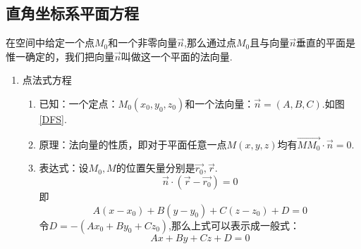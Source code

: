 \subsection{直角坐标系平面方程}
\tdefination[法向量]
在空间中给定一个点$M_0$和一个非零向量$\overrightarrow{n}$,那么通过点$M_0$且与向量$\overrightarrow{n}$垂直的平面是惟一确定的，我们把向量$\overrightarrow{n}$叫做这一个平面的法向量. 

\begin{enumerate}[\large1.]
	\item {\color{dy}\large 点法式方程}
	\begin{enumerate}[]
		\item 已知：{\color{dl}一个定点}：$M_0(x_0,y_0,z_0)$和{\color{dl}一个法向量}：$\overrightarrow{n}=(A,B,C)$.如图\ref{DFS}.
		\item 原理：法向量的性质，即对于平面任意一点$M(x,y,z)$均有$\overrightarrow{MM_0}\cdot \overrightarrow{n}=0$. 
		\item 表达式：设$M_0,M$的位置矢量分别是$\overrightarrow{r_0},\overrightarrow{r}$.
		\begin{equation}
		\overrightarrow{n}\cdot\left(  \overrightarrow{r}-\overrightarrow{r_0}\right) =0
		\end{equation}
		即
		\begin{equation}
		A(x-x_0)+B(y-y_0)+C(z-z_0)+D=0
		\end{equation}
		\quad 令$D=-(Ax_0+By_0+Cz_0)$,那么上式可以表示成一般式：
		\begin{equation}
		Ax+By+Cz+D=0
		\end{equation}
	\end{enumerate}
	\begin{figure}[h]
		\centering 
\end{figure}
\end{enumerate}
